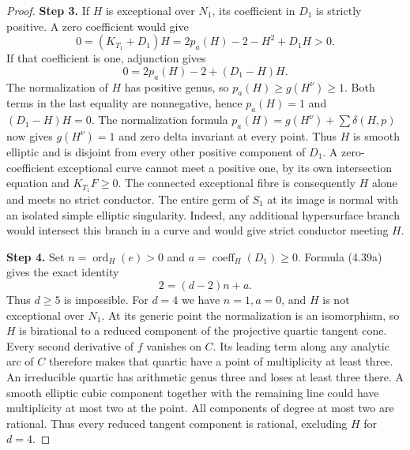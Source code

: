 \begin{proof}
\noindent\textbf{Step 3.} If $H$ is exceptional over $N_1$, its coefficient in $D_1$
is strictly positive. A zero coefficient would give
\[
 0=(K_{T_1}+D_1)H
   =2p_a(H)-2-H^2+D_1H>0.
\]
If that coefficient is one, adjunction gives
\[
 0=2p_a(H)-2+(D_1-H)H.
\]
The normalization of $H$ has positive genus, so $p_a(H)\ge g(H^\nu)\ge1$. Both terms in the last equality are nonnegative, hence $p_a(H)=1$ and $(D_1-H)H=0$. The normalization formula $p_a(H)=g(H^\nu)+\sum\delta(H,p)$ now gives $g(H^\nu)=1$ and zero delta invariant at every point. Thus $H$ is smooth elliptic and is disjoint from every other positive component of $D_1$. A zero-coefficient exceptional
curve cannot meet a positive one, by its own intersection
equation and $K_{T_1}F\ge0$. The connected exceptional
fibre is consequently $H$ alone and meets no strict conductor.
The entire germ of $S_1$ at its image is normal with an
isolated simple elliptic singularity. Indeed, any additional
hypersurface branch would intersect this branch in a curve
and would give strict conductor meeting $H$.

\noindent\textbf{Step 4.} Set $n=\operatorname{ord}_H(e)>0$ and
$a=\operatorname{coeff}_H(D_1)\ge0$. Formula (4.39a)
gives the exact identity
\[
                       2=(d-2)n+a.                    \tag{4.39b}
\]
Thus $d\ge5$ is impossible. For $d=4$ we have
$n=1,a=0$, and $H$ is not exceptional over $N_1$.
At its generic point the normalization is an isomorphism,
so $H$ is birational to a reduced component of the projective
quartic tangent cone. Every second derivative of $f$ vanishes
on $C$. Its leading term along any analytic arc of $C$
therefore makes that quartic have a point of multiplicity
at least three. An irreducible quartic has arithmetic genus
three and loses at least three there. A smooth elliptic cubic
component together with the remaining line could have
multiplicity at most two at the point. All components of
degree at most two are rational. Thus every reduced tangent
component is rational, excluding $H$ for $d=4$.


\end{proof}
